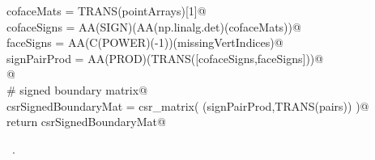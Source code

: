 \documentclass[11pt,oneside]{article}	%
\begin{document}
\begin{flushleft}
\begin{minipage}{\linewidth}
\begin{list}{}{}
\mbox{}\verb@   cofaceMats = TRANS(pointArrays)[1]@\\
\mbox{}\verb@   cofaceSigns = AA(SIGN)(AA(np.linalg.det)(cofaceMats))@\\
\mbox{}\verb@   faceSigns = AA(C(POWER)(-1))(missingVertIndices)@\\
\mbox{}\verb@   signPairProd = AA(PROD)(TRANS([cofaceSigns,faceSigns]))@\\
\mbox{}\verb@   @\\
\mbox{}\verb@   # signed boundary matrix@\\
\mbox{}\verb@   csrSignedBoundaryMat = csr_matrix( (signPairProd,TRANS(pairs)) )@\\
\mbox{}\verb@   return csrSignedBoundaryMat@\\
\mbox{}\verb@@{\NWsep}
\end{list}
\vspace{-1ex}
\footnotesize\addtolength{\baselineskip}{-1ex}
\begin{list}{}{\setlength{\itemsep}{-\parsep}\setlength{\itemindent}{-\leftmargin}}
\item \NWtxtMacroRefIn\ .
\end{list}
\end{minipage}\\[4ex]
\end{flushleft}
\end{document}
